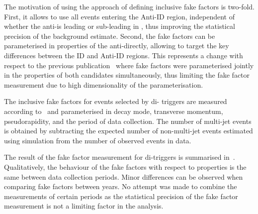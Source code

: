 {  %


  The motivation of using the approach of defining inclusive fake
  factors is two-fold. First, it allows to use all events entering the
  Anti-ID region, independent of whether the anti-\tauhadvis is
  leading or sub-leading in \pT, thus improving the statistical
  precision of the background estimate. Second, the fake factors can
  be parameterised in properties of the anti-\tauhadvis directly,
  allowing to target the key differences between the ID and Anti-ID
  regions. This represents a change with respect to the previous
  publication~\cite{HIGG-2016-16-witherratum} where fake factors were
  parameterised jointly in the properties of both \tauhadvis candidates
  simultaneously, thus limiting %
  the fake factor measurement due to high dimensionality of the
  parameterisation.}

The inclusive fake factors for events selected by di-\tauhadvis
triggers are measured according to~ and
parameterised in \tauhadvis decay mode, transverse momentum,
pseudorapidity, and the period of data collection. The number of
multi-jet events is obtained by subtracting the expected number of
non-multi-jet events estimated using simulation from the number of
observed events in data.

The result of the fake factor measurement for di-\tauhadvis triggers
is summarised in~. Qualitatively, the
behaviour of the fake factors with respect to \tauhadvis properties is
the same between data collection periods. Minor differences can be
observed when comparing fake factors between years. No attempt was
made to combine the measurements of certain periods as the statistical
precision of the fake factor measurement is not a limiting factor in
the analysis.

